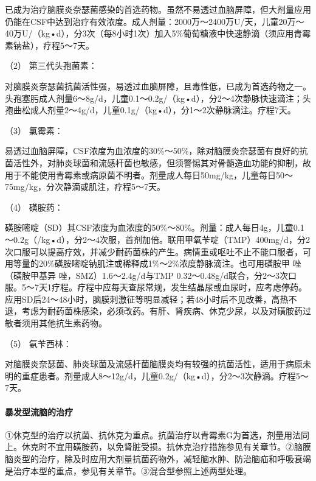 已成为治疗脑膜炎奈瑟菌感染的首选药物。虽然不易透过血脑屏障，但大剂量应用仍能在CSF中达到治疗有效浓度。成人剂量：2000万～2400万U/天，儿童20万～40万U/（kg•d），分3次（每8小时1次）加入5\%葡萄糖液中快速静滴（须应用青霉素钠盐），疗程5～7天。

\hypertarget{text00231.htmlux5cux23CHP7-11-3-2-2}{}
（2） 第三代头孢菌素：

对脑膜炎奈瑟菌抗菌活性强，易透过血脑屏障，且毒性低，已成为首选药物之一。头孢塞肟成人剂量6～8g/d，儿童0.1～0.2g/（kg•d），分2～4次静脉快速滴注；头孢曲松成人剂量2～4g/d，儿童0.1g/（kg•d），分1～2次静脉滴注。疗程7天。

\hypertarget{text00231.htmlux5cux23CHP7-11-3-2-3}{}
（3） 氯霉素：

易透过血脑屏障，CSF浓度为血浓度的30\%～50\%，除对脑膜炎奈瑟菌有良好的抗菌活性外，对肺炎球菌和流感杆菌也敏感，但须警惕其对骨髓造血功能的抑制，故用于不能使用青霉素或病原菌不明者。剂量成人每日50mg/kg，儿童每日50～75mg/kg，分次静滴或肌注，疗程5～7天。

\hypertarget{text00231.htmlux5cux23CHP7-11-3-2-4}{}
（4） 磺胺药：

磺胺嘧啶（SD）其CSF浓度为血浓度的50\%～80\%。剂量：成人每日4g，儿童0.1～0.2g（/kg•d），分2～4次服，首剂加倍。联用甲氧苄啶（TMP）400mg/d，分2次口服可以提高疗效，并减少耐药菌株的产生。病情重或呕吐不止不能口服者，可用等量的20\%磺胺嘧啶钠肌注或稀释成1\%～2\%浓度静脉滴注。也可用磺胺甲{}
唑（磺胺甲基异{} 唑，SMZ）1.6～2.4g/d与TMP
0.32～0.48g/d联合，分2～3次口服。5～7天1疗程。疗程中应每天查尿常规，发生结晶尿或血尿时，应考虑停药。应用SD后24～48小时，脑膜刺激征等明显减轻；若48小时后不见改善，高热不退，考虑为耐药菌株感染，必须改药。有肝、肾疾病、休克少尿，以及对磺胺药过敏者须用其他抗生素药物。

\hypertarget{text00231.htmlux5cux23CHP7-11-3-2-5}{}
（5） 氨苄西林：

对脑膜炎奈瑟菌、肺炎球菌及流感杆菌脑膜炎均有较强的抗菌活性，适用于病原未明的重症患者。剂量成人8～12g/d，儿童0.2g/（kg•d），分2～3次静滴。疗程5～7天。

\paragraph{暴发型流脑的治疗}

①休克型的治疗以抗菌、抗休克为重点。抗菌治疗以青霉素G为首选，剂量用法同上。休克时不宜用磺胺药，以免肾脏受损。抗休克治疗措施参见有关章节。②脑膜脑炎型的治疗，除及时应用大剂量抗菌药物外，减轻脑水肿、防治脑疝和呼吸衰竭是治疗本型的重点，参见有关章节。③混合型参照上述两型处理。

